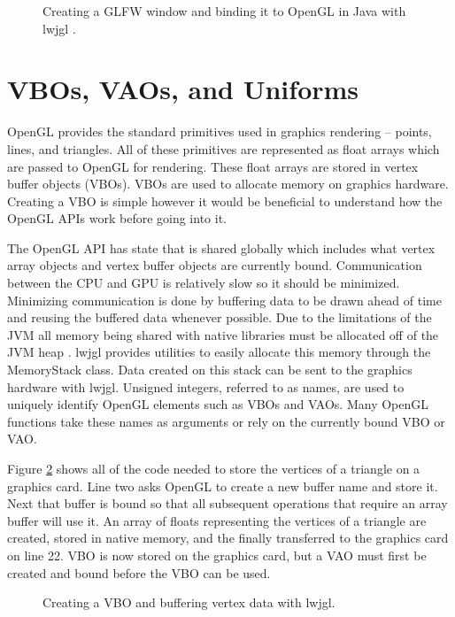 \documentclass{article}
\begin{document}
\begin{figure}[h]
	
	\caption{Creating a GLFW window and binding it to OpenGL in Java with lwjgl \cite{lwjgl}.}
	\label{fig:glfw-creation}
\end{figure}

\section{VBOs, VAOs, and Uniforms}
OpenGL provides the standard primitives used in graphics rendering -- points, lines, and triangles. All of these primitives are represented as float arrays which are passed to OpenGL for rendering. These float arrays are stored in vertex buffer objects (VBOs). VBOs are used to allocate memory on graphics hardware. Creating a VBO is simple however it would be beneficial to understand how the OpenGL APIs work before going into it.

The OpenGL API has state that is shared globally which includes what vertex array objects and vertex buffer objects are currently bound. Communication between the CPU and GPU is relatively slow so it should be minimized. Minimizing communication is done by buffering data to be drawn ahead of time and reusing the buffered data whenever possible. Due to the limitations of the JVM all memory being shared with native libraries must be allocated off of the JVM heap \cite{lwjglwiki}. lwjgl provides utilities to easily allocate this memory through the MemoryStack class. Data created on this stack can be sent to the graphics hardware with lwjgl. Unsigned integers, referred to as names, are used to uniquely identify OpenGL elements such as VBOs and VAOs. Many OpenGL functions take these names as arguments or rely on the currently bound VBO or VAO.

Figure \ref{fig:create-vbo} shows all of the code needed to store the vertices of a triangle on a graphics card. Line two asks OpenGL to create a new buffer name and store it. Next that buffer is bound so that all subsequent operations that require an array buffer will use it. An array of floats representing the vertices of a triangle are created, stored in native memory, and the finally transferred to the graphics card on line 22. VBO is now stored on the graphics card, but a VAO must first be created and bound before the VBO can be used.

\begin{figure}[h]
	
	\caption{Creating a VBO and buffering vertex data with lwjgl.}
	\label{fig:create-vbo}
\end{figure}
\end{document}
